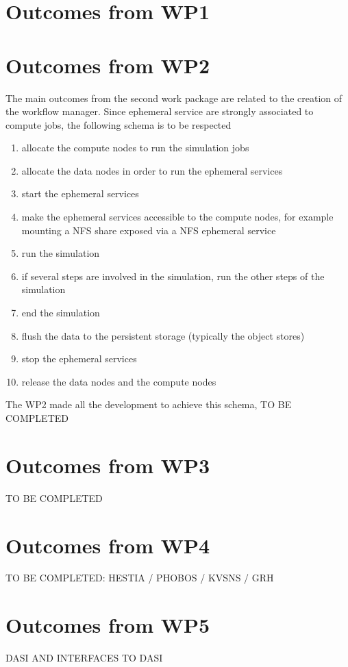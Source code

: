 \section{Outcomes from WP1}

\section{Outcomes from WP2}

The main outcomes from the second work package are related to the creation of the workflow manager. Since
ephemeral service are strongly associated to compute jobs, the following schema is to be respected
\begin{enumerate}
    \item allocate the compute nodes to run the simulation jobs
    \item allocate the data nodes in order to run the ephemeral services
    \item start the ephemeral services
    \item make the ephemeral services accessible to the compute nodes, for example mounting a NFS share
    exposed via a NFS ephemeral service
    \item run the simulation
    \item if several steps are involved in the simulation, run the other steps of the simulation
    \item end the simulation
    \item flush the data to the persistent storage (typically the object stores)
    \item stop the ephemeral services
    \item release the data nodes and the compute nodes
\end{enumerate}

The WP2 made all the development to achieve this schema, TO BE COMPLETED

\section{Outcomes from WP3}

TO BE COMPLETED

\section{Outcomes from WP4}

TO BE COMPLETED: HESTIA / PHOBOS / KVSNS / GRH

\section{Outcomes from WP5}

DASI AND INTERFACES TO DASI



